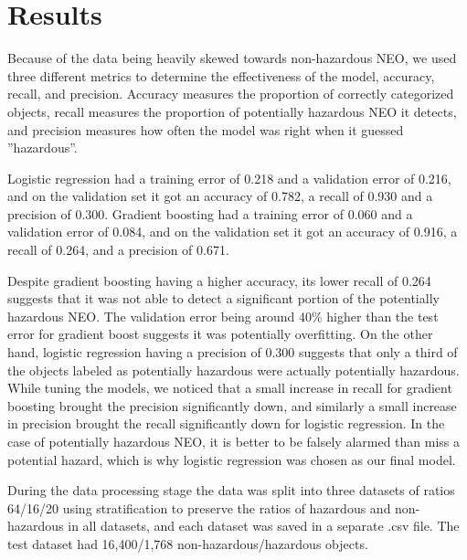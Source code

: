 \documentclass{article}
\begin{document}
\section{Results}

Because of the data being heavily skewed towards non-hazardous NEO, we used three different metrics to determine the effectiveness of the model, accuracy, recall, and precision. Accuracy measures the proportion of correctly categorized objects, recall measures the proportion of potentially hazardous NEO it detects, and precision measures how often the model was right when it guessed ''hazardous''. %

\vspace{1em}

Logistic regression had a training error of 0.218 and a validation error of 0.216, and on the validation set it got an accuracy of 0.782, a recall of 0.930 and a precision of 0.300. Gradient boosting had a training error of 0.060 and a validation error of 0.084, and on the validation set it got an accuracy of 0.916, a recall of 0.264, and a precision of 0.671.

\vspace{1em}

Despite gradient boosting having a higher accuracy, its lower recall of 0.264 suggests that it was not able to detect a significant portion of the potentially hazardous NEO. The validation error being around 40\% higher than the test error for gradient boost suggests it was potentially overfitting. On the other hand, logistic regression having a precision of 0.300 suggests that only a third of the objects labeled as potentially hazardous were actually potentially hazardous. While tuning the models, we noticed that a small increase in recall for gradient boosting brought the precision significantly down, and similarly a small increase in precision brought the recall significantly down for logistic regression. In the case of potentially hazardous NEO, it is better to be falsely alarmed than miss a potential hazard, which is why logistic regression was chosen as our final model.



\vspace{1em}

During the data processing stage the data was split into three datasets of ratios 64/16/20 using stratification to preserve the ratios of hazardous and non-hazardous in all datasets, and each dataset was saved in a separate .csv file. The test dataset had 16,400/1,768 non-hazardous/hazardous objects.
\end{document}
